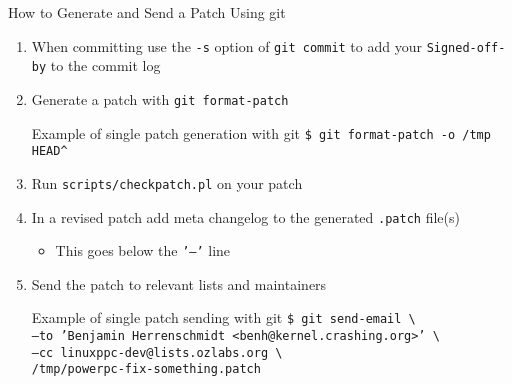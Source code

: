 \documentclass{beamer}
\begin{document}
\begin{frame}{How to Generate and Send a Patch Using git}
  \begin{enumerate}
  \item When committing use the \texttt{-s} option of \texttt{git
    commit} to add your \texttt{Signed-off-by} to the commit log
  \item Generate a patch with \texttt{git format-patch}
    \begin{exampleblock}{Example of single patch generation with git}
      \scriptsize\texttt{\$ git format-patch -o /tmp HEAD\^}
    \end{exampleblock}
  \item Run \texttt{scripts/checkpatch.pl} on your patch
  \item In a revised patch add meta changelog to the generated
    \texttt{.patch} file(s)
    \begin{itemize}
    \item This goes below the \texttt{'---'} line
    \end{itemize}
  \item Send the patch to relevant lists and maintainers
    \begin{exampleblock}{Example of single patch sending with git}
      \scriptsize\texttt{\$ git send-email
        \textbackslash \\ \hspace{5mm} --to 'Benjamin Herrenschmidt
        <benh@kernel.crashing.org>' \textbackslash \\ \hspace{5mm}
        --cc linuxppc-dev@lists.ozlabs.org \textbackslash
        \\ \hspace{5mm} /tmp/powerpc-fix-something.patch}
    \end{exampleblock}
  \end{enumerate}
\end{frame}
\end{document}
